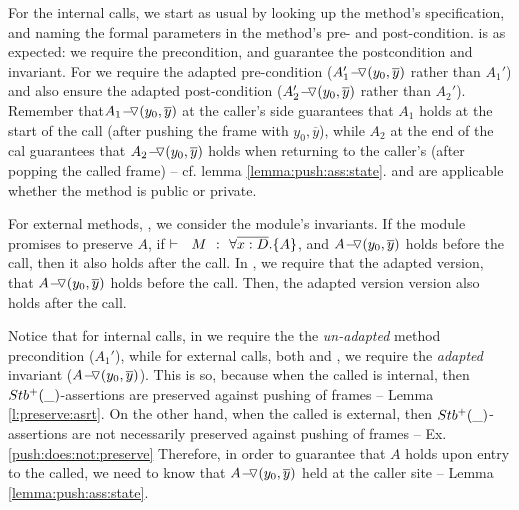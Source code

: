 For the internal calls, we  start as usual by looking up the method's specification, and 
naming the formal   parameters in the method's pre- and post-condition.
  {} is as expected:   we  require the precondition, and guarantee the postcondition and invariant.
For {} we require the adapted pre-condition ($  \PushASLong {(y_0, \overline y)}{A_1'}$  rather than $A_1'$) and also ensure the adapted post-condition ($ \PushASLong {(y_0, \overline y)}{A_2'}$  rather than $A_2'$).
Remember that$  \PushASLong {(y_0, \overline y)}{A_1}$ at the caller's side guarantees that $A_1$ holds at the start of the call  (after pushing the frame with   $y_0, \overline y$), while  
$A_2$ at the end of the cal  guarantees that  $ \PushASLong {(y_0, \overline y)}{A_2}$  holds when returning to the caller's   (after popping the called frame)
-- cf.  lemma \ref{lemma:push:ass:state}.
 {} and {}  are applicable whether the method is public or private.


For external methods,  {}, we consider the module's invariants. If the module promises to preserve $A$, \ie if  $\promises M   {\TwoStatesN {\overline {x:D}} {A}}$, and   $ \PushASLong {(y_0, \overline y)}{A}$  holds before the call, then it also holds after  the call.
In  {},  we require that the adapted version,  \ie that   $ \PushASLong {(y_0, \overline y)}{A}$ holds before the call. Then, the 
adapted version version also holds after the call. 


\vspace{.1cm}

Notice that %
 for internal calls, in {} we require the the \emph{un-adapted} %
 method  precondition (\ie $A_1'$), while for external calls, both {} and {}, we require the 
 \emph{adapted} %
 invariant (\ie $ \PushASLong {(y_0, \overline y)}{A}$). 
This is so, because when the called is internal, then  %
 $\Pos{\_}$-assertions are preserved against pushing of frames -- \cf Lemma \ref{l:preserve:asrt}. 
On the other hand, when the called is external, then $\Pos{\_}$-assertions are not necessarily preserved against pushing of frames -- \cf Ex. \ref{push:does:not:preserve} 
Therefore, in order to guarantee that $A$ holds upon entry to the called, we need to know that $ \PushASLong {(y_0, \overline y)}{A}$ held at the caller site -- \cf Lemma \ref{lemma:push:ass:state}.

